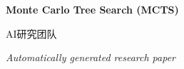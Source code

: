 \documentclass[12pt]{article}
\begin{document}
\begin{titlepage}
  \centering\vspace*{2cm}
  {\Huge\bfseries Monte Carlo Tree Search (MCTS)\par}\vspace{1.5cm}
  {\large AI研究团队\par}\vspace{0.5cm}{\large \today\par}\vfill
  {\large \textit{Automatically generated research paper}\par}
\end{titlepage}

\begin{abstract}
本论文围绕“Monte Carlo Tree Search (MCTS)”展开，汇总文献、阐述方法并给出讨论与结论。
\end{abstract}

\tableofcontents\newpage









\end{document}
